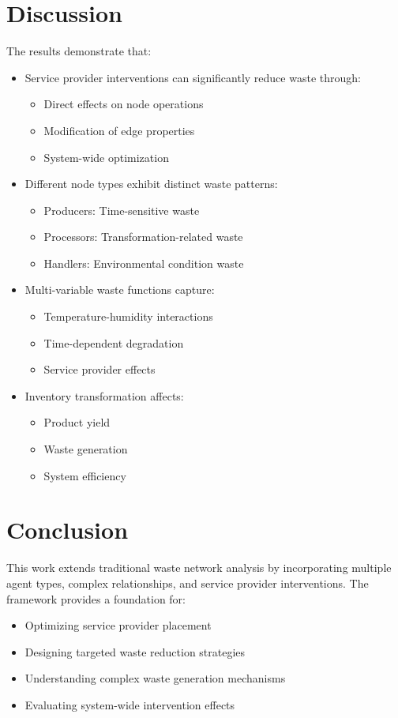 \documentclass[12pt]{article}
\theoremstyle{definition}
\begin{document}
\section{Discussion}
The results demonstrate that:
\begin{itemize}
    \item Service provider interventions can significantly reduce waste through:
        \begin{itemize}
            \item Direct effects on node operations
            \item Modification of edge properties
            \item System-wide optimization
        \end{itemize}
    \item Different node types exhibit distinct waste patterns:
        \begin{itemize}
            \item Producers: Time-sensitive waste
            \item Processors: Transformation-related waste
            \item Handlers: Environmental condition waste
        \end{itemize}
    \item Multi-variable waste functions capture:
        \begin{itemize}
            \item Temperature-humidity interactions
            \item Time-dependent degradation
            \item Service provider effects
        \end{itemize}
    \item Inventory transformation affects:
        \begin{itemize}
            \item Product yield
            \item Waste generation
            \item System efficiency
        \end{itemize}
\end{itemize}

\section{Conclusion}
This work extends traditional waste network analysis by incorporating multiple agent types, complex relationships, and service provider interventions. The framework provides a foundation for:
\begin{itemize}
    \item Optimizing service provider placement
    \item Designing targeted waste reduction strategies
    \item Understanding complex waste generation mechanisms
    \item Evaluating system-wide intervention effects
\end{itemize}
\end{document}
